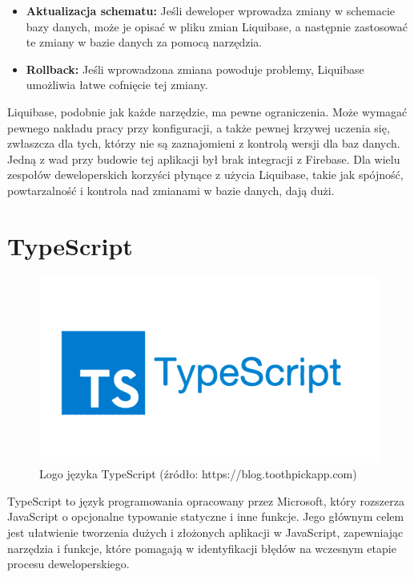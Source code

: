 \begin{itemize}
\item \textbf{Aktualizacja schematu:} Jeśli deweloper wprowadza zmiany w schemacie bazy danych, może je opisać w pliku zmian Liquibase, a następnie zastosować te zmiany w bazie danych za pomocą narzędzia.

\item \textbf{Rollback:} Jeśli wprowadzona zmiana powoduje problemy, Liquibase umożliwia łatwe cofnięcie tej zmiany.
\end{itemize}
Liquibase, podobnie jak każde narzędzie, ma pewne ograniczenia. Może wymagać pewnego nakładu pracy przy konfiguracji, a także pewnej krzywej uczenia się, zwłaszcza dla tych, którzy nie są zaznajomieni z kontrolą wersji dla baz danych. Jedną z wad przy budowie tej aplikacji był brak integracji z Firebase. Dla wielu zespołów deweloperskich korzyści płynące z użycia Liquibase, takie jak spójność, powtarzalność i kontrola nad zmianami w bazie danych, dają dużi\cite{liquibaseSpecs}.

\section{TypeScript}
\begin{figure}[h]
    \centering
    \includegraphics[width=0.5\linewidth]{./img/typescript.png}
    \caption{Logo języka TypeScript (źródło: https://blog.toothpickapp.com)}
    \label{fig:TypeScript}
\end{figure}
TypeScript to język programowania opracowany przez Microsoft, który rozszerza JavaScript o opcjonalne typowanie statyczne i inne funkcje. Jego głównym celem jest ułatwienie tworzenia dużych i złożonych aplikacji w JavaScript, zapewniając narzędzia i funkcje, które pomagają w identyfikacji błędów na wczesnym etapie procesu deweloperskiego.

